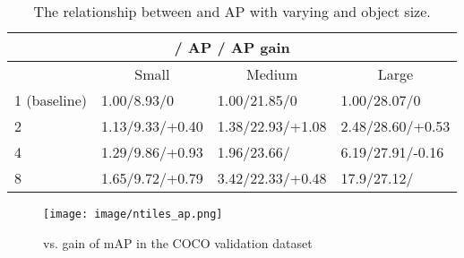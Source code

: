 \documentclass[10pt,twocolumn,letterpaper]{article}
\begin{document}
\begin{table}[hb]
\caption{The relationship between  and AP with varying  and object size.
}
\begin{center}
\begin{adjustbox}{width=1.0\linewidth}
\begin{tabular}{|clll|}
\hline
\multicolumn{4}{|c|}{ / AP / AP gain}                                 \\ \hline
\multicolumn{1}{|c|}{} & \multicolumn{1}{c}{Small} & \multicolumn{1}{c}{Medium} & \multicolumn{1}{c|}{Large} \\ \hline
\multicolumn{1}{|l|}{1 (baseline)}     & 1.00/8.93/0      & 1.00/21.85/0          & 1.00/28.07/0         \\
\multicolumn{1}{|l|}{2}     & 1.13/9.33/+0.40  & 1.38/22.93/+1.08 & 2.48/28.60/+0.53  \\
\multicolumn{1}{|l|}{4}     & 1.29/9.86/+0.93 & 1.96/23.66/\color{blue}{+1.81} & 6.19/27.91/-0.16 \\
\multicolumn{1}{|l|}{8}     & 1.65/9.72/+0.79 & 3.42/22.33/+0.48 & 17.9/27.12/\color{red}{-0.95} \\ \hline
\end{tabular}
\end{adjustbox}
\label{tab:nt_andmAP}
\end{center}
\end{table}


\begin{figure}[ht]
    \centering
    \texttt{[image: image/ntiles\_ap.png]}
    \caption{ vs. gain of mAP in the COCO validation dataset}
    \label{fig:nt_and_mAP}
\end{figure}
\end{document}
